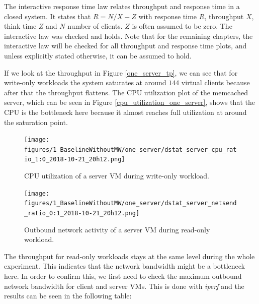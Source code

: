 The interactive response time law relates throughput and response time in a closed system. It states that $R=N/X-Z$ with response time $R$, throughput $X$, think time $Z$ and $N$ number of clients. $Z$ is often assumed to be zero. The interactive law was checked and holds. Note that for the remaining chapters, the interactive law will be checked for all throughput and response time plots, and unless explicitly stated otherwise, it can be assumed to hold. 

If we look at the throughput in Figure \ref{one_server_tp}, we can see that for write-only workloads the system saturates at around $144$ virtual clients because after that the throughput flattens. The CPU utilization plot of the memcached server, which can be seen in Figure \ref{cpu_utilization_one_server}, shows that the CPU is the bottleneck here because it almost reaches full utilization at around the saturation point. 

\begin{figure}[H]
    \begin{minipage}{0.48\textwidth}
        \centering
	    \texttt{[image: figures/1\_BaselineWithoutMW/one\_server/dstat\_server\_cpu\_ratio\_1:0\_2018-10-21\_20h12.png]}
	    \caption{CPU utilization of a server VM during write-only workload.}
	    \label{cpu_utilization_one_server}
    \end{minipage}\hfill
    \begin{minipage}{0.48\textwidth}
        \centering
	    \texttt{[image: figures/1\_BaselineWithoutMW/one\_server/dstat\_server\_netsend\_ratio\_0:1\_2018-10-21\_20h12.png]}
	    \caption{Outbound network activity of a server VM during read-only workload.}
	    \label{outbound_net_activity_one_server}
    \end{minipage}
\end{figure}

The throughput for read-only workloads stays at the same level during the whole experiment. This indicates that the network bandwidth might be a bottleneck here. In order to confirm this, we first need to check the maximum outbound network bandwidth for client and server VMs. This is done with \textit{iperf} and the results can be seen in the following table: 

